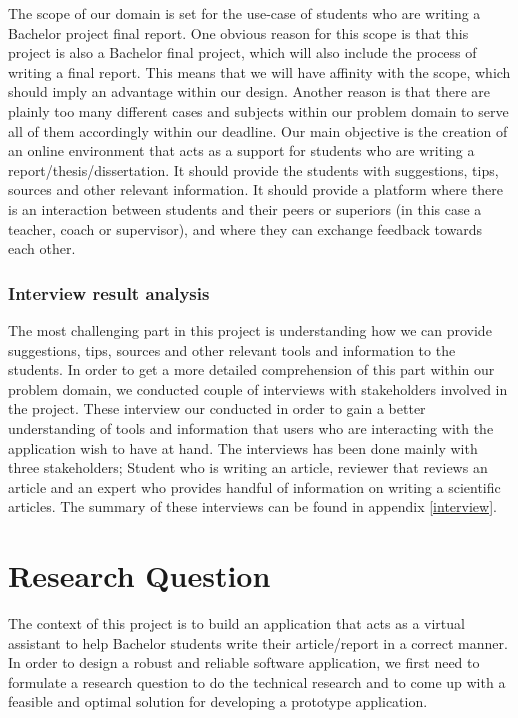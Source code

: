 The scope of our domain is set for the use-case of students who are writing a Bachelor project final report. One obvious reason for this scope is that this project is also a Bachelor final project, which will also include the process of writing a final report. This means that we will have affinity with the scope, which should imply an advantage within our design. Another reason is that there are plainly too many different cases and subjects within our problem domain to serve all of them accordingly within our deadline.
Our main objective is the creation of an online environment that acts as a support for students who are writing a report/thesis/dissertation. It should provide the students with suggestions, tips, sources and other relevant information. It should provide a platform where there is an interaction between students and their peers or superiors (in this case a teacher, coach or supervisor), and where they can exchange feedback towards each other.

\subsubsection{Interview result analysis} %

The most challenging part in this project is understanding how we can provide suggestions, tips, sources and other relevant tools and information to the students. In order to get a more detailed comprehension of this part within our problem domain, we conducted couple of interviews with stakeholders involved in the project. These interview our conducted in order to gain a better understanding of tools and information that users who are interacting with the application wish to have at hand. The interviews has been done mainly with three stakeholders; Student who is writing an article, reviewer that reviews an article and an expert who provides handful of information on writing a scientific articles. The summary of these interviews can be found in appendix \ref{interview}.




\section{Research Question}

The context of this project is to build an application that acts as a virtual assistant to help Bachelor students write their article/report in a correct manner. In order to design a robust and reliable software application, we first need to formulate a research question to do the technical research and to come up with a feasible and optimal solution for developing a prototype application.\\\\


